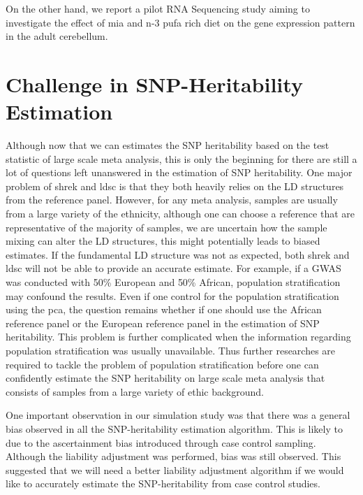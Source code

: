 \documentclass[12pt]{book}
\begin{document}
	On the other hand, we report a pilot RNA Sequencing study aiming to investigate the effect of \acrfull{mia} and n-3 \gls{pufa} rich diet on the gene expression pattern in the adult cerebellum. 
	\section{Challenge in SNP-Heritability Estimation}
	Although now that we can estimates the \gls{SNP} heritability based on the test statistic of large scale meta analysis, this is only the beginning for there are still a lot of questions left unanswered in the estimation of \gls{SNP} heritability.
	One major problem of \gls{shrek} and \gls{ldsc} is that they both heavily relies on the \gls{LD} structures from the reference panel.
	However, for any meta analysis, samples are usually from a large variety of the ethnicity, although one can choose a reference that are representative of the majority of samples, we are uncertain how the sample mixing can alter the \gls{LD} structures, this might potentially leads to biased estimates.
	If the fundamental \gls{LD} structure was not as expected, both \gls{shrek} and \gls{ldsc} will not be able to provide an accurate estimate. 
	For example, if a \gls{GWAS} was conducted with 50\% European and 50\% African, population stratification may confound the results.
	Even if one control for the population stratification using the \gls{pca}, the question remains whether if one should use the African reference panel or the European reference panel in the estimation of \gls{SNP} heritability.
	This problem is further complicated when the information regarding population stratification was usually unavailable. 
	Thus further researches are required to tackle the problem of population stratification before one can confidently estimate the \gls{SNP} heritability on large scale meta analysis that consists of samples from a large variety of ethic background.
	
	One important observation in our simulation study was that there was a general bias observed in all the \gls{SNP}-heritability estimation algorithm.
	This is likely to due to the ascertainment bias introduced through case control sampling.
	Although the liability adjustment was performed, bias was still observed. 
	This suggested that we will need a better liability adjustment algorithm if we would like to accurately estimate the \gls{SNP}-heritability from case control studies.
	
\end{document}
